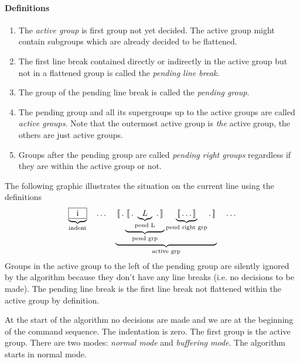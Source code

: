 \documentclass[12pt]{article}
\def\GS{\,[\![\,}
\def\GE{\,]\!]\,}
\begin{document}
\paragraph{Definitions}
\begin{enumerate}
\item The \emph{active group} is first group not yet decided. The active group
  might contain subgroups which are already decided to be flattened.

\item The first line break contained directly or indirectly in the active
  group but not in a flattened group is called the \emph{pending line break}.

\item The group of the pending line break is called the \emph{pending group}.

\item The pending group and all its supergroups up to the active groups are
  called \emph{active groups}. Note that the outermost active group is
  \emph{the} active group, the others are just active groups.

\item Groups after the pending group are called
  \emph{pending right groups} regardless if they are within the active group
  or not.
\end{enumerate}
%
The following graphic illustrates the situation on the current line using the
definitions
$$%
  \underbrace{\text{\framebox[8mm][c]{i}}}_\text{indent}
  \quad\ldots\quad
  \underbrace{
    \GS.
    \underbrace{\GS .
      \underbrace{L}_\text{pend L} .
      \GE}_\text{pend grp}
    \underbrace{\GS \ldots \GE}_\text{pend right grp}
    . \GE
  }_\text{active grp}
  \quad\ldots
$$%
Groups in the active group to the left of the pending group are silently
ignored by the algorithm because they don't have any line breaks (i.e. no
decisions to be made). The pending line break is the first line break not
flattened within the active group by definition.

At the start of the algorithm no decisions are made and we are at the
beginning of the command sequence. The indentation is zero. The first group is
the active group. There are two modes: \emph{normal mode} and \emph{buffering
  mode}. The algorithm starts in normal mode.
\end{document}
